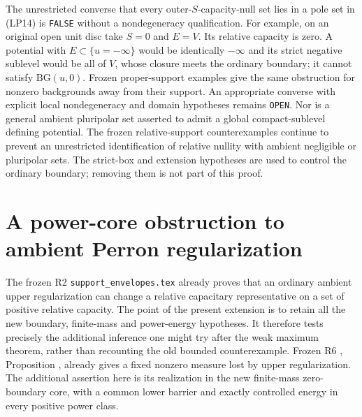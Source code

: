 \documentclass[11pt,a4paper]{article}
\numberwithin{equation}{section}
\theoremstyle{definition}
\theoremstyle{remark}
\begin{document}
The unrestricted converse that every outer-$S$-capacity-null set
lies in a pole set in (LP14) is \texttt{FALSE} without a
nondegeneracy qualification. For example, on an original open
unit disc take $S=0$ and $E=V$. Its relative capacity is zero.
A potential with $E\subset\{u=-\infty\}$ would be identically
$-\infty$ and its strict negative sublevel would be all of $V$,
whose closure meets the ordinary boundary; it cannot satisfy
$\mathrm{BG}(u,0)$. Frozen proper-support examples give the
same obstruction for nonzero backgrounds away from their support.
An appropriate converse with explicit local nondegeneracy and
domain hypotheses remains \texttt{OPEN}. Nor is a general
ambient pluripolar set asserted to admit a global compact-sublevel
defining potential. The frozen relative-support counterexamples
continue to prevent an unrestricted identification of relative
nullity with ambient negligible or pluripolar sets.
The strict-box and extension hypotheses are used to control
the ordinary boundary; removing them is not part of this proof.



\section{A power-core obstruction to ambient Perron regularization}
\label{sec:r11-power-core-envelope-obstruction}

The frozen R2 \texttt{support\_envelopes.tex} already proves
that an ordinary ambient upper regularization can change a
relative capacitary representative on a set of positive relative
capacity. The point of the present extension is to retain all
the new boundary, finite-mass and power-energy hypotheses.
It therefore tests precisely the additional inference one might
try after the weak maximum theorem, rather than recounting the
old bounded counterexample. Frozen R6
, Proposition
, already
gives a fixed nonzero measure lost by upper regularization.
The additional assertion here is its realization in the new
finite-mass zero-boundary core, with a common lower barrier
and exactly controlled energy in every positive power class.
\end{document}
